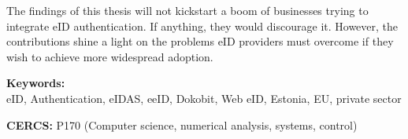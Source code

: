 \documentclass[12pt]{article}
\newcommand{\TODO}{\todo[inline]}
\begin{document}
{{\noindent
The findings of this thesis will not kickstart a boom of businesses trying to integrate eID authentication. If anything, they would discourage it. However, the contributions shine a light on the problems eID providers must overcome if they wish to achieve more widespread adoption.


\vspace*{1ex}

\noindent\textbf{Keywords:}\\
eID, Authentication, eIDAS, eeID, Dokobit, Web eID, Estonia, EU, private sector

\vspace*{1ex}

\noindent\textbf{CERCS:} P170 (Computer science, numerical analysis, systems, control)

\vspace*{1ex}
}}%







\end{document}

